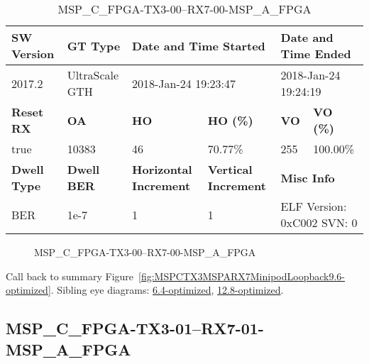 \begin{table}[h]
\centering
\caption{MSP\_C\_FPGA-TX3-00--RX7-00-MSP\_A\_FPGA}
\label{tab:MSPCFPGATX300RX700MSPAFPGA9.6-optimized}
\begin{tabular}{@{}|l|l|l|l|l|l|@{}}
\toprule
\textbf{SW Version}                & \textbf{GT Type}   & \multicolumn{2}{l|}{\textbf{Date and Time Started}}            & \multicolumn{2}{l|}{\textbf{Date and Time Ended}}        \\ \midrule
2017.2                       & UltraScale GTH          & \multicolumn{2}{l|}{2018-Jan-24 19:23:47}                   & \multicolumn{2}{l|}{2018-Jan-24 19:24:19}               \\ \midrule
\textbf{Reset RX}                  & \textbf{OA} & \textbf{HO}   & \textbf{HO (\%)} & \textbf{VO} & \textbf{VO (\%)} \\ \midrule
true & 10383        & 46          & 70.77\%        & 255        & 100.00\%       \\ \midrule
\textbf{Dwell Type}                & \textbf{Dwell BER} & \textbf{Horizontal Increment} & \textbf{Vertical Increment}    & \multicolumn{2}{l|}{\textbf{Misc Info}}                  \\ \midrule
BER                            & 1e-7        & 1        & 1           & \multicolumn{2}{l|}{ELF Version: 0xC002 SVN: 0}                         \\ \bottomrule
\end{tabular}
\end{table}

\begin{figure}[h]
\caption{MSP\_C\_FPGA-TX3-00--RX7-00-MSP\_A\_FPGA} \label{fig:MSPCFPGATX300RX700MSPAFPGA9.6-optimized}
\end{figure}

Call back to summary Figure~\ref{fig:MSPCTX3MSPARX7MinipodLoopback9.6-optimized}.
Sibling eye diagrams: \hyperref[sec:MSPCFPGATX300RX700MSPAFPGA6.4-optimized]{6.4-optimized}, \hyperref[sec:MSPCFPGATX300RX700MSPAFPGA12.8-optimized]{12.8-optimized}.

\clearpage
\newpage


\subsection{MSP\_C\_FPGA-TX3-01--RX7-01-MSP\_A\_FPGA}\label{sec:MSPCFPGATX301RX701MSPAFPGA9.6-optimized}

